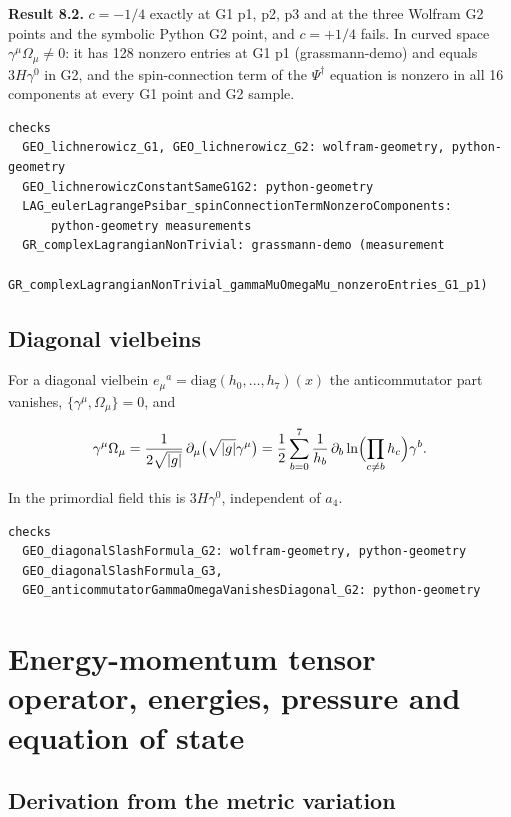 \documentclass[11pt]{article}
\begin{document}
\textbf{Result 8.2.} $c=-1/4$ exactly at G1 p1, p2, p3 and at the three Wolfram G2 points and the symbolic Python G2 point, and $c=+1/4$ fails. In curved space $\gamma^\mu\Omega_\mu\ne0$: it has 128 nonzero entries at G1 p1 (grassmann-demo) and equals $3H\gamma^0$ in G2, and the spin-connection term of the $\Psi^\dagger$ equation is nonzero in all 16 components at every G1 point and G2 sample.

\begin{Verbatim}[fontsize=\small]
checks
  GEO_lichnerowicz_G1, GEO_lichnerowicz_G2: wolfram-geometry, python-geometry
  GEO_lichnerowiczConstantSameG1G2: python-geometry
  LAG_eulerLagrangePsibar_spinConnectionTermNonzeroComponents:
      python-geometry measurements
  GR_complexLagrangianNonTrivial: grassmann-demo (measurement
      GR_complexLagrangianNonTrivial_gammaMuOmegaMu_nonzeroEntries_G1_p1)
\end{Verbatim}

\subsection{Diagonal vielbeins}

For a diagonal vielbein $e_\mu{}^a=\mathrm{diag}(h_0,\dots,h_7)(x)$ the anticommutator part vanishes, $\{\gamma^\mu,\Omega_\mu\}=0$, and

\[
\gamma^\mu\Omega_\mu=\frac1{2\sqrt{|g|}}\,\partial_\mu\bigl(\sqrt{|g|}\gamma^\mu\bigr)=\frac12\sum_{b=0}^{7}\frac1{h_b}\,\partial_b\ln\Bigl(\prod_{c\ne b}h_c\Bigr)\gamma^b .
\]

In the primordial field this is $3H\gamma^0$, independent of $a_4$.

\begin{Verbatim}[fontsize=\small]
checks
  GEO_diagonalSlashFormula_G2: wolfram-geometry, python-geometry
  GEO_diagonalSlashFormula_G3,
  GEO_anticommutatorGammaOmegaVanishesDiagonal_G2: python-geometry
\end{Verbatim}

\section{Energy-momentum tensor operator, energies, pressure and equation of state}

\subsection{Derivation from the metric variation}
\end{document}
